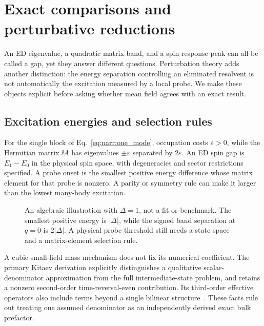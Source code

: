 \chapter{Exact comparisons and perturbative reductions}
\label{narr:comparisons}

An ED eigenvalue, a quadratic matrix band, and a spin-response peak can all be
called a gap, yet they answer different questions. Perturbation theory adds
another distinction: the energy separation controlling an eliminated resolvent
is not automatically the excitation measured by a local probe. We make these
objects explicit before asking whether mean field agrees with an exact result.

\section{Excitation energies and selection rules}
For the single block of Eq.~\eqref{eq:narr:one_mode}, occupation costs
$\varepsilon>0$, while the Hermitian matrix $\ii A$ has eigenvalues
$\pm\varepsilon$ separated by $2\varepsilon$. An ED spin gap is
$E_1-E_0$ in the physical spin space, with degeneracies and sector restrictions
specified. A probe onset is the smallest positive energy difference whose
matrix element for that probe is nonzero. A parity or symmetry rule can make
it larger than the lowest many-body excitation.

\begin{figure}[htbp]
\centering
{}
\caption{An algebraic illustration with $\Delta=1$, not a fit or benchmark.
The smallest positive energy is $|\Delta|$, while the signed band separation
at $q=0$ is $2|\Delta|$. A physical probe threshold still needs a state space
and a matrix-element selection rule.}
\end{figure}

A cubic small-field mass mechanism does not fix its numerical coefficient.
The primary Kitaev derivation explicitly distinguishes a qualitative
scalar-denominator approximation from the full intermediate-state problem,
and retains a nonzero second-order time-reversal-even contribution. Its
third-order effective operators also include terms beyond a single bilinear
structure~\cite{Kitaev2006}. These facts rule out treating one assumed denominator
as an independently derived exact bulk prefactor.

